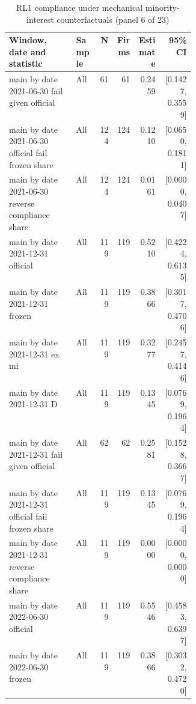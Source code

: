 \begin{table}[!htbp]\centering\scriptsize
\caption{RL1 compliance under mechanical minority-interest counterfactuals (panel 6 of 23)}
\begin{threeparttable}
\begin{tabular}{p{0.36\linewidth}lrrrr}
\toprule
Window, date and statistic & Sample & N & Firms & Estimate & 95\% CI \\
\midrule
main by date 2021-06-30 fail given official & All & 61 & 61 & 0.2459 & [0.1427, 0.3559] \\
main by date 2021-06-30 official fail frozen share & All & 124 & 124 & 0.1210 & [0.0650, 0.1811] \\
main by date 2021-06-30 reverse compliance share & All & 124 & 124 & 0.0161 & [0.0000, 0.0407] \\
main by date 2021-12-31 official & All & 119 & 119 & 0.5210 & [0.4224, 0.6135] \\
main by date 2021-12-31 frozen & All & 119 & 119 & 0.3866 & [0.3017, 0.4706] \\
main by date 2021-12-31 ex mi & All & 119 & 119 & 0.3277 & [0.2457, 0.4146] \\
main by date 2021-12-31 D & All & 119 & 119 & 0.1345 & [0.0769, 0.1964] \\
main by date 2021-12-31 fail given official & All & 62 & 62 & 0.2581 & [0.1528, 0.3667] \\
main by date 2021-12-31 official fail frozen share & All & 119 & 119 & 0.1345 & [0.0769, 0.1964] \\
main by date 2021-12-31 reverse compliance share & All & 119 & 119 & 0.0000 & [0.0000, 0.0000] \\
main by date 2022-06-30 official & All & 119 & 119 & 0.5546 & [0.4583, 0.6397] \\
main by date 2022-06-30 frozen & All & 119 & 119 & 0.3866 & [0.3032, 0.4720] \\
\bottomrule
\end{tabular}
\begin{tablenotes}[flushleft]\footnotesize

\end{tablenotes}
\end{threeparttable}
\end{table}
